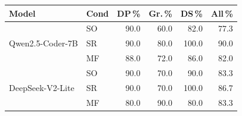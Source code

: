 \begin{tabular}{@{}llrrrr@{}}
\toprule
Model & Cond & DP\,\% & Gr.\,\% & DS\,\% & All\,\% \\
\midrule
\multirow{3}{*}{Qwen2.5-Coder-7B} & SO & 90.0 & 60.0 & 82.0 & 77.3 \\
& SR & 90.0 & 80.0 & 100.0 & 90.0 \\
& MF & 88.0 & 72.0 & 86.0 & 82.0 \\
\midrule
\multirow{3}{*}{DeepSeek-V2-Lite} & SO & 90.0 & 70.0 & 90.0 & 83.3 \\
& SR & 90.0 & 70.0 & 100.0 & 86.7 \\
& MF & 80.0 & 90.0 & 80.0 & 83.3 \\
\bottomrule
\end{tabular}
